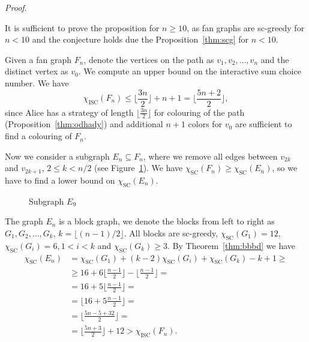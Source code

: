 \documentclass[11pt,a4paper]{article}
\theoremstyle{plain}
\newenvironment{pf}{
  \par\medskip\noindent
  \textit{Proof}.
}{
\newline
\rightline{$\square$}  %
}
\theoremstyle{definition}
\theoremstyle{remark}
\newcommand{\scn}{\chi_\text{SC}}
\newcommand{\iscn}{\chi_\text{ISC}}
\begin{document}
\begin{pf}
It is sufficient to prove the proposition for $n\geq 10$, as fan graphs are sc-greedy for $n< 10$ and the conjecture holds due the Proposition~\ref{thm:scg} for $n< 10$.

Given a fan graph $F_n$, denote the vertices on the path as $v_1, v_2, \ldots, v_n$ and the distinct vertex as $v_0$. We compute an upper bound on the interactive sum choice number. We have 
$$\iscn(F_n) \leq \lfloor{\frac{3n}{2}}\rfloor + n + 1 = \lfloor{\frac{5n+2}{2}}\rfloor,$$ since Alice has a strategy of length $\lfloor{\frac{3n}{2}}\rfloor$ for colouring of the path (Proposition~\ref{thm:odhady}) and additional $n+1$ colors for $v_0$ are sufficient to find a colouring of $F_n$.

Now we consider a subgraph $E_n \subseteq F_n$, where we remove all edges between $v_{2k}$ and $v_{2k+1}$, $2\leq k < n/2$ (see Figure~\ref{fig:fan2}). We have $\scn(F_n) \geq \scn(E_n)$, so we have to find a lower bound on $\scn(E_n)$. 

\begin{figure}[h]
\centering
{}
\caption{Subgraph $E_9$}
\label{fig:fan2}
\end{figure}

The graph $E_n$ is a block graph, we denote the blocks from left to right as $G_1, G_2, \ldots, G_k$, $k=\lfloor{(n-1)/2}\rfloor$. All blocks are sc-greedy, $\scn(G_1) = 12$, $\scn(G_i)= 6, 1<i<k$ and $\scn(G_k)\geq 3$. By Theorem~\ref{thm:bbbd} we have
\begin{align*}
\scn(E_n) &= \scn(G_1) + (k-2)\scn(G_i) + \scn(G_k) - k + 1 \geq \\
	&\geq 16 + 6\lfloor{\frac{n-1}{2}}\rfloor - \lfloor{\frac{n-1}{2}}\rfloor = \\
	&= 16 + 5\lfloor{\frac{n-1}{2}}\rfloor = \\
	&= \lfloor{16 + 5\frac{n-1}{2}}\rfloor = \\
	&= \lfloor{\frac{5n-5+32}{2}}\rfloor = \\ 
	&= \lfloor{\frac{5n+3}{2}}\rfloor + 12 > \iscn(F_n).
\end{align*}
\end{pf}
\end{document}
